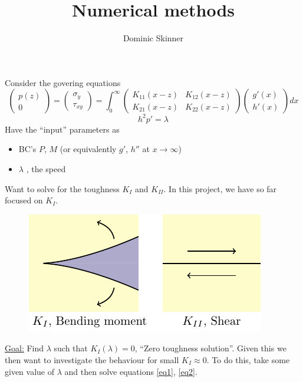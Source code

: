 \documentclass{article}
\begin{document}
\title{Numerical methods}
\author{Dominic Skinner}
\maketitle

Consider the govering equations
\begin{equation}\label{eq1}
\left( \begin{array}{c} p(z) \\ 0 \end{array} \right) =
 \left( \begin{array}{c} \sigma_y \\ \tau_{xy} \end{array} \right) =
\int_0^{\infty} \left(
\begin{array}{cc} K_{11}(x-z) & K_{12}(x-z) \\ K_{21}(x-z) & K_{22}(x-z) \end{array}
\right)
 \left( \begin{array}{c} g'(x) \\ h'(x) \end{array} \right) dx
\end{equation}
%
\begin{equation}\label{eq2}
h^2p'=\lambda
\end{equation}
Have the ``input'' parameters as 
\begin{itemize}
\item BC's $P$, $M$ (or equivalently $g'$, $h''$ at $x\to\infty$)
\item $\lambda$ , the speed
\end{itemize}
Want to solve for the toughness $K_I$ and $K_{II}$. In this project,
we have so far focused on $K_I$.
\begin{figure}[!ht]\centering
\includegraphics{NumFig3.pdf}
\end{figure}

\underline{Goal:} 
Find $\lambda$ such that $K_I(\lambda)=0$, ``Zero toughness solution''.
Given this we then want to investigate the behaviour for small $K_I\approx 0$.
To do this, take some given value of $\lambda$ and then solve equations
\ref{eq1}, \ref{eq2}.
\end{document}
